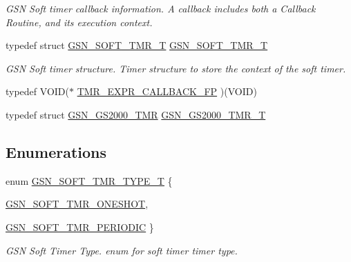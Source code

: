 \begin{DoxyCompactItemize}
\begin{DoxyCompactList}\small\item\em GSN Soft timer callback information. A callback includes both a Callback Routine, and its execution context. \end{DoxyCompactList}\item 
typedef struct \hyperlink{a00229}{GSN\_\-SOFT\_\-TMR\_\-T} \hyperlink{a00673_gac713d53bc7c13a7102bfce1b01b30c60}{GSN\_\-SOFT\_\-TMR\_\-T}
\begin{DoxyCompactList}\small\item\em GSN Soft timer structure. Timer structure to store the context of the soft timer. \end{DoxyCompactList}\item 
typedef VOID($\ast$ \hyperlink{a00586_a108e60c810cf3cd77f8efec30a64360c}{TMR\_\-EXPR\_\-CALLBACK\_\-FP} )(VOID)
\item 
typedef struct \hyperlink{a00084}{GSN\_\-GS2000\_\-TMR} \hyperlink{a00586_adfb1858590760717af53362f09f8c373}{GSN\_\-GS2000\_\-TMR\_\-T}
\end{DoxyCompactItemize}
\subsection*{Enumerations}
\begin{DoxyCompactItemize}
\item 
enum \hyperlink{a00673_ga599ea0a212c1bcd484a64610d070b5af}{GSN\_\-SOFT\_\-TMR\_\-TYPE\_\-T} \{ \par
\hyperlink{a00673_gga599ea0a212c1bcd484a64610d070b5afaed34a4f447dd6a4da5771c0a29d502c3}{GSN\_\-SOFT\_\-TMR\_\-ONESHOT}, 
\par
\hyperlink{a00673_gga599ea0a212c1bcd484a64610d070b5afa0fdc43c704fbf8c462b2e87ddc6aea6d}{GSN\_\-SOFT\_\-TMR\_\-PERIODIC}
 \}
\begin{DoxyCompactList}\small\item\em GSN Soft Timer Type. enum for soft timer timer type. \end{DoxyCompactList}\end{DoxyCompactItemize}
